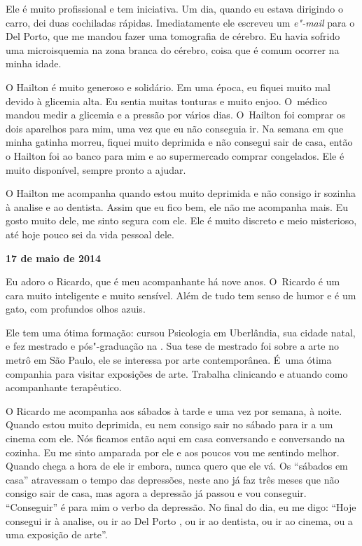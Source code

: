 Ele é muito profissional e tem iniciativa. Um dia, quando eu estava
dirigindo o carro, dei duas cochiladas rápidas. Imediatamente ele
escreveu um \emph{e"-mail} para o Del Porto, que me mandou fazer uma
tomografia de cérebro. Eu havia sofrido uma microisquemia na zona branca
do cérebro, coisa que é comum ocorrer na minha idade.

O Hailton é muito generoso e solidário. Em uma época, eu fiquei muito
mal devido à glicemia alta. Eu sentia muitas tonturas e muito enjoo. O~médico mandou medir a glicemia e a pressão por vários dias. O~Hailton
foi comprar os dois aparelhos para mim, uma vez que eu não conseguia ir.
Na semana em que minha gatinha morreu, fiquei muito deprimida e não
consegui sair de casa, então o Hailton foi ao banco para mim e ao
supermercado comprar congelados. Ele é muito disponível, sempre pronto a
ajudar.

O Hailton me acompanha quando estou muito deprimida e não consigo ir
sozinha à analise e ao dentista. Assim que eu fico bem, ele não me
acompanha mais. Eu gosto muito dele, me sinto segura com ele. Ele é
muito discreto e meio misterioso, até hoje pouco sei da vida pessoal
dele.

\begin{center}\asterisc{}\end{center}

\begin{flushright}\textbf{17 de maio de 2014}\end{flushright}


Eu adoro o Ricardo, que é meu acompanhante há nove anos. O~Ricardo é um
cara muito inteligente e muito sensível. Além de tudo tem senso de humor
e é um gato, com profundos olhos azuis.

Ele tem uma ótima formação: cursou Psicologia em Uberlândia, sua cidade
natal, e fez mestrado e pós"-graduação na . Sua tese de mestrado foi
sobre a arte no metrô em São Paulo, ele se interessa por arte
contemporânea. É~uma ótima companhia para visitar exposições de arte.
Trabalha clinicando e atuando como acompanhante terapêutico.

O Ricardo me acompanha aos sábados à tarde e uma vez por semana, à
noite. Quando estou muito deprimida, eu nem consigo sair no sábado para
ir a um cinema com ele. Nós ficamos então aqui em casa conversando e
conversando na cozinha. Eu me sinto amparada por ele e aos poucos vou me
sentindo melhor. Quando chega a hora de ele ir embora, nunca quero que
ele vá. Os ``sábados em casa'' atravessam o tempo das depressões, neste
ano já faz três meses que não consigo sair de casa, mas agora a
depressão já passou e vou conseguir. ``Conseguir'' é para mim o verbo da
depressão. No final do dia, eu me digo: ``Hoje consegui ir à analise, ou
ir ao Del Porto , ou ir ao dentista, ou ir ao cinema, ou a uma exposição
de arte''.

